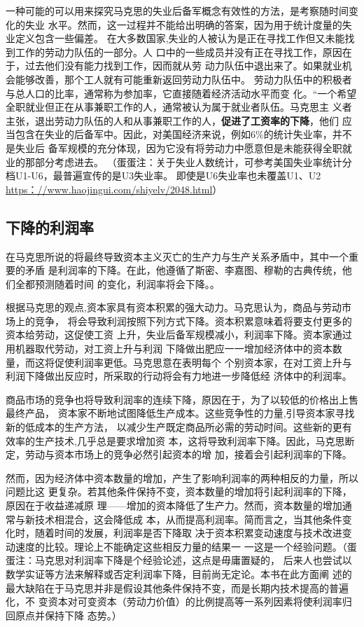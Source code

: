 一种可能的可以用来探究马克思的失业后备军概念有效性的方法，是考察随时间变化的失业
水平。然而，这一过程并不能给出明确的答案，因为用于统计度量的失业定义包含一些偏差。
在大多数国家,失业的人被认为是正在寻找工作但又未能找到工作的劳动力队伍的一部分。人
口中的一些成员并没有正在寻找工作，原因在于，过去他们没有能力找到工作，因而就从劳
动力队伍中退出来了。如果就业机会能够改善，那个工人就有可能重新返回劳动力队伍中。
劳动力队伍中的积极者与总人口的比率，通常称为参加率，它直接随着经济活动水平而变
化。“一个希望全职就业但正在从事兼职工作的人，通常被认为属于就业者队伍。马克思主
义者主张，退出劳动力队伍的人和从事兼职工作的人，\textbf{促进了工资率的下降}，他们
应当包含在失业的后备军中。因此，对美国经济来说，例如6\%的统计失业率，并不是失业后
备军规模的充分体现，因为它没有将劳动力中愿意但是未能获得全职就业的那部分考虑进去。
（蛋蛋注：关于失业人数统计，可参考美国失业率统计分档U1-U6，最普遍宣传的是U3失业率。
即使是U6失业率也未覆盖U1、U2 \url{https：//www.haojingui.com/shiyelv/2048.html}）

\subsection{下降的利润率}

在马克思所说的将最终导致资本主义灭亡的生产力与生产关系矛盾中，其中一个重要的矛盾
是利润率的下降。在此，他遵循了斯密、李嘉图、穆勒的古典传统，他们全都预测随着时间
的变化，利润率将会下降。。

根据马克思的观点,资本家具有资本积累的强大动力。马克思认为，商品与劳动市场上的竞争，
将会导致利润按照下列方式下降。资本积累意味着将要支付更多的资本给劳动，这促使工资
上升，失业后备军规模减小，利润率下降。资本家通过用机器取代劳动，对工资上升与利润
下降做出肥应一一增加经济体中的资本数量，而这将促使利润率更低。马克思意在表明每个
个别资本家，在对工资上升与利润下降做出反应时，所采取的行动将会有力地进一步降低经
济体中的利润率。

商品市场的竞争也将导致利润率的连续下降，原因在于，为了以较低的价格出上售最终产品，
资本家不断地试图降低生产成本。这些竞争性的力量,引导资本家寻找新的低成本的生产方法，
以减少生产既定商品所必需的劳动时间。这些新的更有效率的生产技术,几乎总是要求增加资
本，这将导致利润率下降。因此，马克思断定，劳动与资本市场上的竞争必然引起资本的增
加，接着会引起利润率的下降。

然而，因为经济体中资本数量的增加，产生了影响利润率的两种相反的力量，所以问题比这
更复杂。若其他条件保持不变，资本数量的增加将引起利润率的下降，原因在于收益递减原
理——增加的资本降低了生产力。然而，资本数量的增加通常与新技术相混合，这会降低成
本，从而提高利润率。简而言之，当其他条件变化时，随着时间的发展，利润率是否下降取
决于资本积累变动速度与技术改进变动速度的比较。理论上不能确定这些相反力量的结果一
一这是一个经验问题。（蛋蛋注：马克思对利润率下降是个经验论述，这点是毋庸置疑的，
后来人也尝试以数学实证等方法来解释或否定利润率下降，目前尚无定论。本书在此方面阐
述的最大缺陷在于马克思并非是假设其他条件保持不变，而是长期内技术提高的普遍化，不
变资本对可变资本（劳动力价值）的比例提高等一系列因素将使利润率归回原点并保持下降
态势。）

